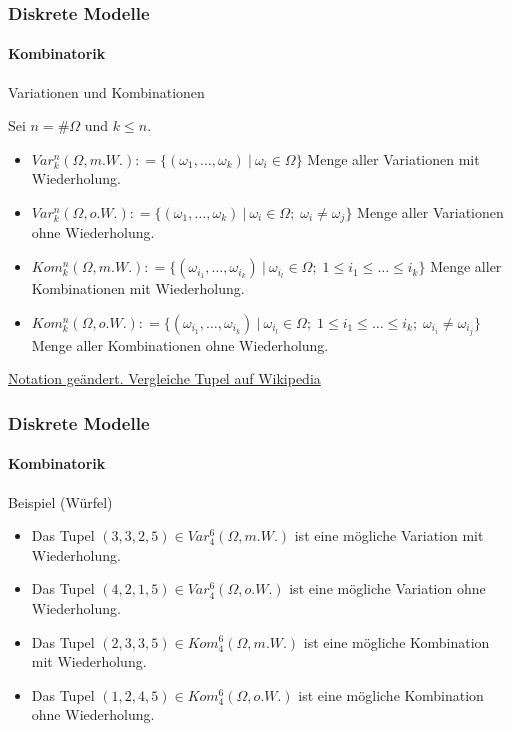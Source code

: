 \documentclass{beamer}
\begin{document}
\begin{frame}
    \frametitle{Diskrete Modelle}
\framesubtitle{Kombinatorik}
\begin{block}{Variationen und Kombinationen}

Sei $n = \#\Omega$ und $k \leq n$.
\begin{itemize}
\item $Var_k^n(\Omega, m.W.) : = \{ ( \omega_1, \ldots, \omega_k) \ |\  \omega_i \in \Omega \}$  Menge aller Variationen mit Wiederholung.
\item $Var_k^n(\Omega, o.W.) : = \{ ( \omega_1, \ldots, \omega_k) \ |\  \omega_i \in \Omega; \;  \omega_i \neq \omega_j  \}$  Menge aller Variationen ohne Wiederholung.
\item $Kom_k^n(\Omega, m.W.) : = \{ ( \omega_{i_1}, \ldots, \omega_{i_k})  \ |\  \omega_{i_l} \in \Omega; \; 1  \leq i_1 \leq  \ldots  \leq i_k  \}$  Menge aller Kombinationen  mit Wiederholung.
\item $Kom_k^n(\Omega, o.W.) : = \{ ( \omega_{i_1}, \ldots, \omega_{i_k} ) \ |\  \omega_{i_l} \in \Omega; \; 1 \leq i_1  \leq \ldots \leq i_k; \;  \omega_{i_i} \neq \omega_{i_j} \} $  Menge aller Kombinationen  ohne  Wiederholung.
\end{itemize}
\href{https://de.wikipedia.org/wiki/Tupel}{Notation geändert. Vergleiche Tupel auf Wikipedia}
\end{block}

 \end{frame}
 
\begin{frame}
    \frametitle{Diskrete Modelle}
\framesubtitle{Kombinatorik}

\begin{block}{Beispiel (Würfel)}
\begin{itemize}
\item Das Tupel $ (3,3,2,5 )  \in Var_4^6(\Omega, m.W.)$ ist eine mögliche Variation mit Wiederholung.
\item Das Tupel $ (4,2,1,5 ) \in Var_4^6(\Omega, o.W.)$ ist eine mögliche Variation ohne Wiederholung.
\item Das Tupel $ (2,3,3,5 )  \in Kom_4^6(\Omega, m.W.)$ ist eine mögliche Kombination mit Wiederholung.
\item Das Tupel $(1,2,4,5) \in Kom_4^6(\Omega, o.W.)$ ist eine mögliche Kombination ohne Wiederholung.

\end{itemize}

\end{block}
 \end{frame}
\end{document}
